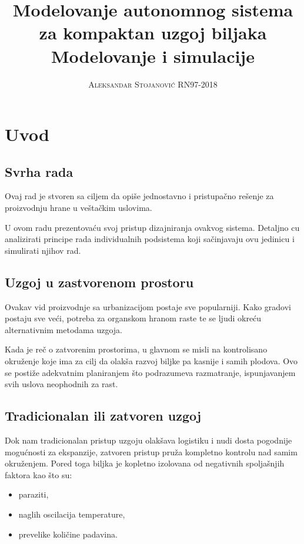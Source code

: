 \documentclass[a4paper,11pt]{book}
\title{\Huge \textbf{Modelovanje autonomnog sistema za kompaktan uzgoj biljaka} \\ \huge Modelovanje i simulacije}
\author{\textsc{Aleksandar Stojanović RN97-2018}}
\begin{document}
\maketitle
\tableofcontents

\chapter*{Uvod}

\section*{Svrha rada}
Ovaj rad je stvoren sa ciljem da opiše jednostavno i pristupačno rešenje za proizvodnju hrane u veštačkim uslovima.

\noindent U ovom radu prezentovaću svoj pristup dizajniranja ovakvog sistema. Detaljno cu analizirati principe rada individualnih podsistema koji sačinjavaju ovu jedinicu i simulirati njihov rad.

\section*{Uzgoj u zastvorenom prostoru}
Ovakav vid proizvodnje sa urbanizacijom postaje sve popularniji. Kako gradovi postaju sve veći, potreba za organskom hranom raste te se ljudi okreću alternativnim metodama uzgoja.

Kada je reč o zatvorenim prostorima, u glavnom se misli na kontrolisano okruženje koje ima za cilj da olakša razvoj biljke pa kasnije i samih plodova. Ovo se postiže adekvatnim planiranjem što podrazumeva razmatranje, ispunjavanjem svih uslova neophodnih za rast. 

\section*{Tradicionalan ili zatvoren uzgoj}
Dok nam tradicionalan pristup uzgoju olakšava logistiku i nudi dosta pogodnije mogućnosti za ekspanzije, zatvoren pristup pruža kompletno kontrolu nad samim okruženjem. Pored toga biljka je kopletno izolovana od negativnih spoljašnjih faktora kao što su:

\begin{itemize}
  \item paraziti,
  \item naglih oscilacija temperature,
  \item prevelike količine padavina.
\end{itemize}
\end{document}
